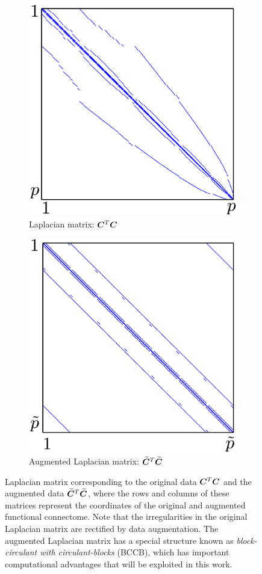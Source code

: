 \renewcommand{\imwidth}  {0.38\linewidth}
\begin{figure}
	\centering
	\begin{subfigure}[t]{\imwidth}
		 \centering
		 \includegraphics[height=.7\linewidth]{laplacemat_noncirc.pdf}
		 \caption{Laplacian matrix: ${\bm{C}}^T{\bm{C}}$}
		 \label{fig:lap,noncirc}
	\end{subfigure}
	\hspace{0.05\linewidth}
	\begin{subfigure}[t]{\imwidth}
		 \centering
		 \includegraphics[height=.7\linewidth]{laplacemat_circ.pdf}
		 \caption{Augmented Laplacian matrix: ${\bm{\widetilde{C}}}^T{\bm{\widetilde{C}}}$}
		 \label{fig:lap,circ}
	\end{subfigure}

	\caption{Laplacian matrix corresponding to the original data ${\bm{C}}^T{\bm{C}}$ and the augmented data ${\bm{\widetilde{C}}}^T{\bm{\widetilde{C}}}$, where the rows and columns of these matrices represent the coordinates of the original and augmented functional connectome.  Note that the irregularities in the original Laplacian matrix are rectified by data augmentation.  The augmented Laplacian matrix has a special structure known as \emph{block-circulant with circulant-blocks} (BCCB), which has important computational advantages that will be exploited in this work.}
	 \label{fig:lap}
\end{figure}

